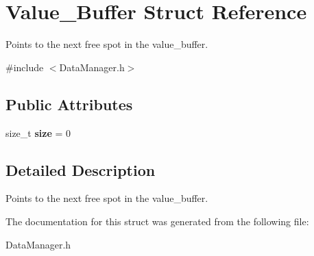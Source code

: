 \hypertarget{struct_value___buffer}{}\section{Value\+\_\+\+Buffer Struct Reference}
\label{struct_value___buffer}


Points to the next free spot in the value\+\_\+buffer.  




{\ttfamily \#include $<$Data\+Manager.\+h$>$}

\subsection*{Public Attributes}
\begin{DoxyCompactItemize}
\item 
\mbox{\label{struct_value___buffer_abd34ed8bfd721d7f6b98cd27d16f19a3}} 
size\+\_\+t {\bfseries size} = 0
\end{DoxyCompactItemize}


\subsection{Detailed Description}
Points to the next free spot in the value\+\_\+buffer. 

The documentation for this struct was generated from the following file\+:\begin{DoxyCompactItemize}
\item 
Data\+Manager.\+h\end{DoxyCompactItemize}
